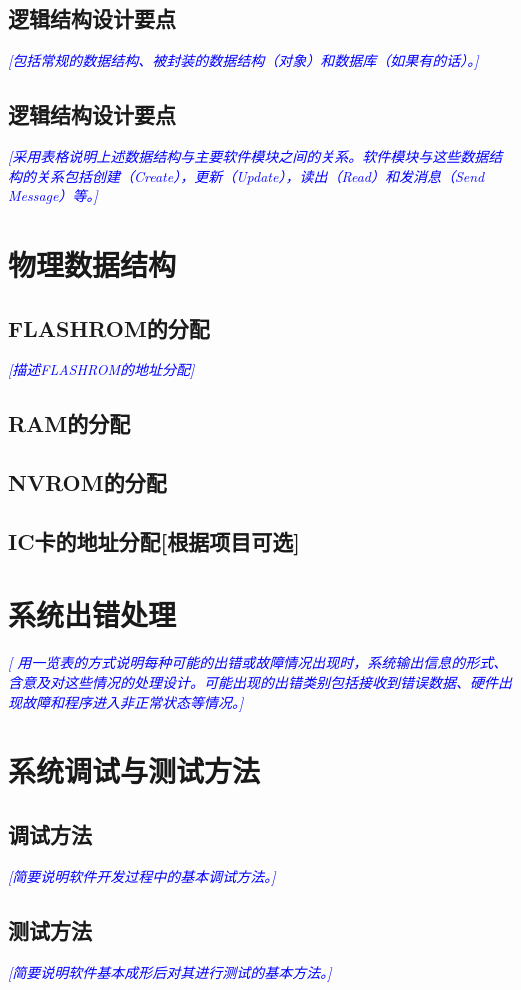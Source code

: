 \documentclass[12pt,a4pape，titlepager]{article}
\newcommand{\bluefont}[1]{\textcolor{blue}{\emph{[#1]}}}
\begin{document}
	\subsection{逻辑结构设计要点}{
		\bluefont{包括常规的数据结构、被封装的数据结构（对象）和数据库（如果有的话）。}
	}
	\subsection{逻辑结构设计要点}{\bluefont
		{采用表格说明上述数据结构与主要软件模块之间的关系。软件模块与这些数据结构的关系包括创建（Create），更新（Update），读出（Read）和发消息（Send Message）等。}
	}
	
	\section{ 物理数据结构}
	\subsection{ FLASHROM的分配}{
		\bluefont{描述FLASHROM的地址分配}
	}

	\subsection{ RAM的分配} 
	\subsection{ NVROM的分配}
	\subsection{ IC卡的地址分配[根据项目可选]} 
	
	\section{系统出错处理}
	\par{{\bluefont{
			用一览表的方式说明每种可能的出错或故障情况出现时，系统输出信息的形式、含意及对这些情况的处理设计。可能出现的出错类别包括接收到错误数据、硬件出现故障和程序进入非正常状态等情况。}}}
	
	\section{系统调试与测试方法}
	\subsection{ 调试方法} {
		\bluefont{简要说明软件开发过程中的基本调试方法。}
	}
	\subsection{ 测试方法} {
		\bluefont{简要说明软件基本成形后对其进行测试的基本方法。}
	}
\end{document}
